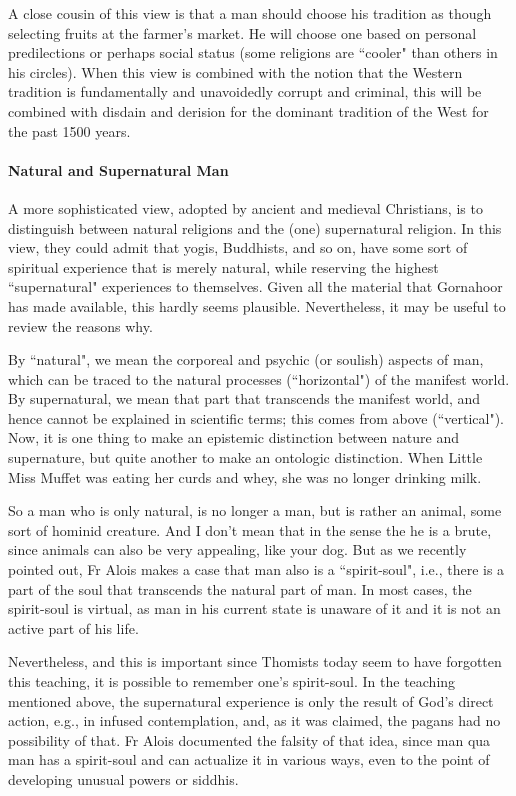 A close cousin of this view is that a man should choose his tradition as though selecting fruits at the farmer's market. He will choose one based on personal predilections or perhaps social status (some religions are ``cooler" than others in his circles). When this view is combined with the notion that the Western tradition is fundamentally and unavoidedly corrupt and criminal, this will be combined with disdain and derision for the dominant tradition of the West for the past 1500 years.

\paragraph{Natural and Supernatural Man}
A more sophisticated view, adopted by ancient and medieval Christians, is to distinguish between natural religions and the (one) supernatural religion. In this view, they could admit that yogis, Buddhists, and so on, have some sort of spiritual experience that is merely natural, while reserving the highest ``supernatural" experiences to themselves. Given all the material that Gornahoor has made available, this hardly seems plausible. Nevertheless, it may be useful to review the reasons why.

By ``natural", we mean the corporeal and psychic (or soulish) aspects of man, which can be traced to the natural processes (``horizontal") of the manifest world. By supernatural, we mean that part that transcends the manifest world, and hence cannot be explained in scientific terms; this comes from above (``vertical"). Now, it is one thing to make an epistemic distinction between nature and supernature, but quite another to make an ontologic distinction. When Little Miss Muffet was eating her curds and whey, she was no longer drinking milk.

So a man who is only natural, is no longer a man, but is rather an animal, some sort of hominid creature. And I don't mean that in the sense the he is a brute, since animals can also be very appealing, like your dog. But as we recently pointed out, Fr Alois makes a case that man also is a ``spirit-soul", i.e., there is a part of the soul that transcends the natural part of man. In most cases, the spirit-soul is virtual, as man in his current state is unaware of it and it is not an active part of his life.

Nevertheless, and this is important since Thomists today seem to have forgotten this teaching, it is possible to remember one's spirit-soul. In the teaching mentioned above, the supernatural experience is only the result of God's direct action, e.g., in infused contemplation, and, as it was claimed, the pagans had no possibility of that. Fr Alois documented the falsity of that idea, since man qua man has a spirit-soul and can actualize it in various ways, even to the point of developing unusual powers or siddhis.

